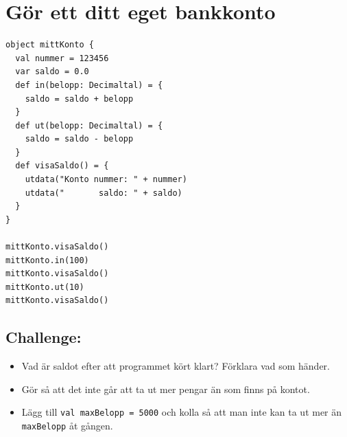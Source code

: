 \chapter{Gör ett ditt eget bankkonto}
\begin{multicols}{2}

\begin{lstlisting}[basicstyle={\ttfamily\fontsize{16}{19}\selectfont},numbers=none]
object mittKonto {
  val nummer = 123456
  var saldo = 0.0
  def in(belopp: Decimaltal) = {
    saldo = saldo + belopp 
  }
  def ut(belopp: Decimaltal) = { 
    saldo = saldo - belopp 
  }
  def visaSaldo() = {
    utdata("Konto nummer: " + nummer) 
    utdata("       saldo: " + saldo)
  }
}

mittKonto.visaSaldo()
mittKonto.in(100)
mittKonto.visaSaldo()
mittKonto.ut(10)
mittKonto.visaSaldo()
\end{lstlisting}
        


\columnbreak


\section*{\color{BrickRed}Challenge:}


\begin{itemize}

\item {Vad är saldot efter att programmet kört klart? Förklara vad som händer.}
\item {Gör så att det inte går att ta ut mer pengar än som finns på kontot.}
\item {Lägg till \lstinline{val maxBelopp = 5000} och kolla så att man inte kan ta ut mer än \lstinline{maxBelopp} åt gången.}

\end{itemize}


\end{multicols}

